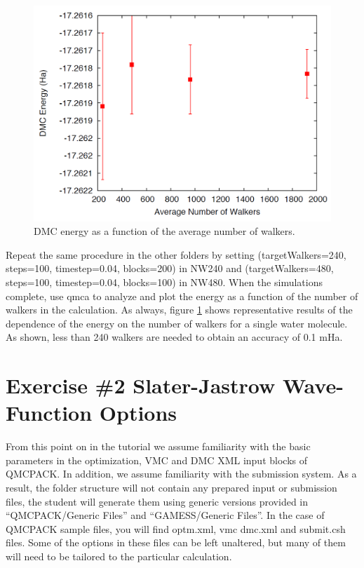 \begin{figure}
\begin{center}
\includegraphics[trim = 0mm 0mm 0mm 0mm, clip,width=0.75\columnwidth]{./figures/lab_advanced_molecules_dmc_popcont}
\end{center}
\caption{DMC energy as a function of the average number of walkers.
\label{fig:lam_dmc_popcont}
}
\end{figure}

Repeat the same procedure in the other folders by setting (targetWalkers=240,
steps=100, timestep=0.04, blocks=200) in NW240 and (targetWalkers=480, 
steps=100, timestep=0.04, blocks=100) in NW480. When
the simulations complete, use qmca to analyze and plot the energy as a function of the
number of walkers in the calculation. As always, figure \ref{fig:lam_dmc_popcont} 
shows representative results of the
dependence of the energy on the number of walkers for a single water molecule. As shown,
less than 240 walkers are needed to obtain an accuracy of 0.1 mHa.


\section{Exercise \#2 Slater-Jastrow Wave-Function Options}
From this point on in the tutorial we assume familiarity with the basic parameters in the
optimization, VMC and DMC XML input blocks of QMCPACK. In addition, we assume
familiarity with the submission system. As a result, the folder structure will not contain
any prepared input or submission files, the student will generate them using generic versions
provided in ``QMCPACK/Generic Files'' and ``GAMESS/Generic Files''. In the case of QMCPACK sample 
files, you will find optm.xml, vmc dmc.xml and submit.csh files. Some of
the options in these files can be left unaltered, but many of them will need to be tailored to
the particular calculation.

